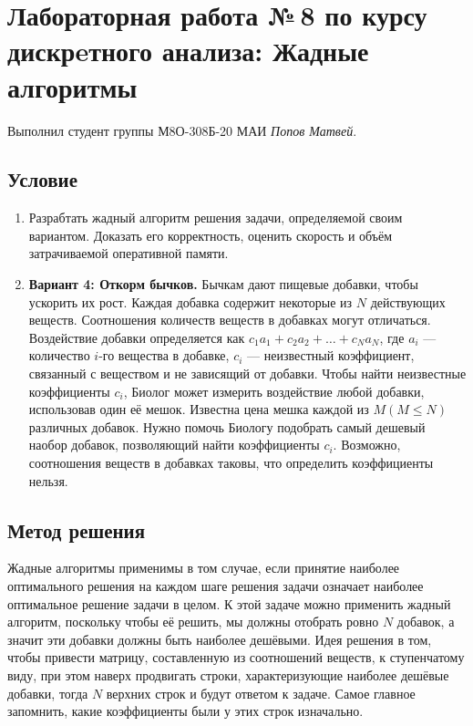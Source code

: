 \documentclass[12pt]{article}
\begin{document}
    \section*{Лабораторная работа №\,8 по курсу дискрeтного анализа: 
    Жадные алгоритмы}

    Выполнил студент группы М8О-308Б-20 МАИ \textit{Попов Матвей}.

    \subsection*{Условие}
 
    \begin{enumerate}
    \item Разрабтать жадный алгоритм решения задачи, определяемой своим
    вариантом. Доказать его корректность, оценить скорость и объём
    затрачиваемой оперативной памяти.
    \item \textbf{Вариант 4: Откорм бычков.} Бычкам дают пищевые добавки, чтобы 
    ускорить их рост. Каждая добавка содержит некоторые из $N$ действующих 
    веществ. Соотношения количеств веществ в добавках могут отличаться.
    Воздействие добавки определяется как $c_1a_1 + c_2a_2 + … + c_Na_N$, где 
    $a_i$ — количество $i$-го вещества в добавке, $c_i$ — неизвестный 
    коэффициент, связанный с веществом и не зависящий от добавки. Чтобы найти 
    неизвестные коэффициенты $c_i$, Биолог может измерить воздействие любой 
    добавки, использовав один её мешок. Известна цена мешка каждой из
    $M(M \leq N)$ различных добавок. Нужно помочь Биологу подобрать самый 
    дешевый наобор добавок, позволяющий найти коэффициенты $c_i$.  Возможно, 
    соотношения веществ в добавках таковы, что определить коэффициенты нельзя.
    \end{enumerate}

    \subsection*{Метод решения}

    Жадные алгоритмы применимы в том случае, если принятие наиболее 
    оптимального решения на каждом шаге решения задачи означает наиболее 
    оптимальное решение задачи в целом. К этой задаче можно применить жадный 
    алгоритм, поскольку чтобы её решить, мы должны отобрать ровно $N$ добавок, 
    а значит эти добавки должны быть наиболее дешёвыми. Идея решения в том, 
    чтобы привести матрицу, составленную из соотношений веществ, к ступенчатому 
    виду, при этом наверх продвигать строки, характеризующие наиболее дешёвые 
    добавки, тогда $N$ верхних строк и будут ответом к задаче. Самое главное 
    запомнить, какие коэффициенты были у этих строк изначально.
\end{document}
